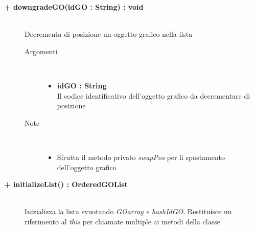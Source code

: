 \begin{description}
\begin{description}
\begin{description}
\begin{itemize}
			\end{itemize}
		\end{description}
	\end{description}
	
	\begin{description}
		\item[\textbf{\color{blue}+ downgradeGO(idGO : String) : void			}] \hfill \\
			Decrementa di posizione un oggetto grafico nella lista
			
		\begin{description}
			\item[Argomenti] \hfill \\
				\begin{itemize}
				
					\item \textbf{idGO : String			} \hfill \\
					Il codice identificativo dell'oggetto grafico da decrementare di posizione
					
				\end{itemize}
				
			\item[Note] \hfill \\
			\begin{itemize}
					\item Sfrutta il metodo privato \textit{swapPos} per li spostamento dell'oggetto grafico
					
			\end{itemize}
		\end{description}
	\end{description}
	
	\begin{description}
		\item[\textbf{\color{blue}+ initializeList() : OrderedGOList			}] \hfill \\
			Inizializza la lista svuotando \textit{GOarray} \textit{e hashIdGO}. Restituisce un riferimento al \textit{this} per chiamate multiple ai metodi della classe 
			
	\end{description}
	
		
	

\end{description}


